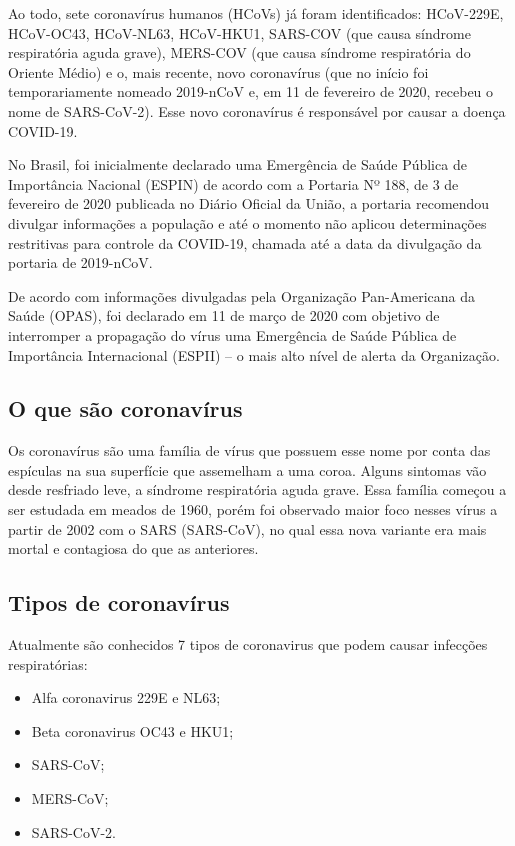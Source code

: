Ao todo, sete coronavírus humanos (HCoVs) já foram identificados: HCoV-229E, HCoV-OC43, HCoV-NL63, HCoV-HKU1, SARS-COV (que causa síndrome respiratória aguda grave), MERS-COV (que causa síndrome respiratória do Oriente Médio) e o, mais recente, novo coronavírus (que no início foi temporariamente nomeado 2019-nCoV e, em 11 de fevereiro de 2020, recebeu o nome de SARS-CoV-2). Esse novo coronavírus é responsável por causar a doença COVID-19.

No Brasil, foi inicialmente declarado uma Emergência de Saúde Pública de Importância Nacional (ESPIN) de acordo com a Portaria Nº 188, de 3 de fevereiro de 2020 publicada no Diário Oficial da União, a portaria recomendou divulgar informações a população e até o momento não aplicou determinações restritivas para controle da COVID-19, chamada até a data da divulgação da portaria de  2019-nCoV.

De acordo com informações divulgadas pela Organização Pan-Americana da Saúde (OPAS), foi declarado em 11 de março de 2020 com objetivo de interromper a propagação do vírus uma Emergência de Saúde Pública de Importância Internacional (ESPII) – o mais alto nível de alerta da Organização.  


\subsection{O que são coronavírus}

Os coronavírus são uma família de vírus que possuem esse nome por conta das espículas na sua superfície que assemelham a uma coroa. Alguns sintomas vão desde resfriado leve, a síndrome respiratória aguda grave. Essa família começou a ser estudada em meados de 1960,  porém foi observado maior foco nesses vírus a partir de 2002 com o SARS (SARS-CoV), no qual essa nova variante era mais mortal e contagiosa do que as anteriores. 

\subsection{Tipos de coronavírus}

Atualmente são conhecidos 7 tipos de coronavirus que podem causar infecções respiratórias:

\begin{itemize}
\item Alfa coronavirus 229E e NL63;
\item Beta coronavirus OC43 e HKU1;
\item SARS-CoV;
\item MERS-CoV;
\item SARS-CoV-2.
\end{itemize}

